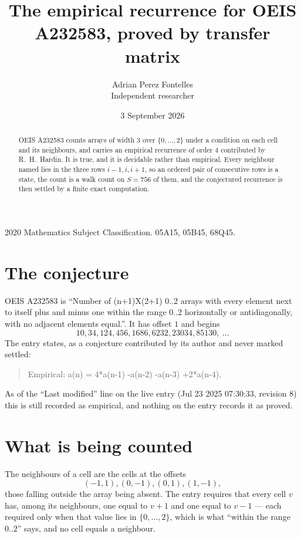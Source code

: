 \documentclass[11pt,a4paper]{article}
\title{The empirical recurrence for OEIS A232583, proved by transfer matrix}
\author{Adrian Perez Fontelles\\ \small Independent researcher}
\date{3 September 2026}
\theoremstyle{plain}
\theoremstyle{definition}
\begin{document}
\maketitle

\begin{abstract}
OEIS A232583 counts arrays of width $3$ over $\{0,\dots,2\}$ under a condition on each cell
and its neighbours, and carries an empirical recurrence of order $4$ contributed by
R.~H.~Hardin. It is true, and it is decidable rather than empirical. Every neighbour named lies
in the three rows $i-1,i,i+1$, so an ordered pair of consecutive rows is a state, the count is
a walk count on $S=756$ of them, and the conjectured recurrence is then settled by a finite
exact computation.
\end{abstract}

\noindent\small 2020 Mathematics Subject Classification. 05A15, 05B45, 68Q45.\normalsize

\section{The conjecture}

OEIS A232583 is ``Number of (n+1)X(2+1) 0..2 arrays with every element next to itself plus and minus one within the range 0..2 horizontally or antidiagonally, with no adjacent elements equal.''. It has offset $1$ and begins
\[
10, 34, 124, 456, 1686, 6232, 23034, 85130,\ \dots
\]
The entry states, as a conjecture contributed by its author and never marked settled:
\begin{quote}
Empirical: a(n) = 4*a(n-1) -a(n-2) -a(n-3) +2*a(n-4).
\end{quote}
As of the ``Last modified'' line on the live entry (Jul 23 2025 07:30:33, revision 8) this is still
recorded as empirical, and nothing on the entry records it as proved.

\section{What is being counted}

The neighbours of a cell are the cells at the offsets
\[
(-1,1), (0,-1), (0,1), (1,-1),
\]
those falling outside the array being absent. The entry requires that every cell $v$ has, among its neighbours, one equal to $v+1$ and one equal to $v-1$ --- each required only when that value lies in $\{0,\dots,2\}$, which is what ``within the range $0..2$'' says, and no cell equals a neighbour.
\end{document}
